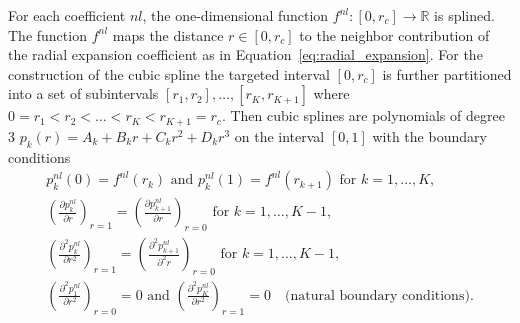 For each coefficient $nl$, the one-dimensional function $f^{nl}:[0,r_c]\rightarrow\mathbb{R}$ is splined.
The function $f^{nl}$ maps the distance $r\in[0,r_c]$ to the neighbor contribution of the radial expansion coefficient as in Equation~\eqref{eq:radial_expansion}.
For the construction of the cubic spline the targeted interval $[0,r_c]$ is further partitioned into a set of subintervals $[r_1, r_2], \ldots, [r_{K}, r_{K+1}]$ where $0 = r_1 < r_2 < \ldots < r_{K} < r_{K+1} = r_c$.
Then cubic splines are polynomials of degree 3 $p_k(r) = A_k + B_kr + C_kr^2 + D_kr^3$ on the interval $[0,1]$ with the boundary conditions
\begin{subequations}
\label{eq:abscissas_boundary_conditions}
\begin{gather}
    p^{nl}_{k}(0) = f^{nl}(r_k)\text{ and } p^{nl}_{k}(1) =  f^{nl}(r_{k+1})\text{ for } k=1,\ldots,K , \label{eq:function_boundary_conditions}\\
    \left(\frac{\partial p^{nl}_{k}}{\partial r}\right)_{r=1} = \left(\frac{\partial p^{nl}_{k+1}}{\partial r}\right)_{r=0} \text{ for } k=1,\ldots,K-1  ,\label{eq:derivative_boundary_conditions}\\
    \left(\frac{\partial^2 p^{nl}_{k}}{\partial r^2}\right)_{r=1} = \left(\frac{\partial^2 p^{nl}_{k+1}}{\partial^2 r}\right)_{r=0} \text{ for } k=1,\ldots,K-1  ,\label{eq:second_derivative_boundary_conditions}\\
    \left(\frac{\partial^2 p^{nl}_{1}}{\partial r^2}\right)_{r=0} = 0\text{ and } \left(\frac{\partial^2 p^{nl}_{K}}{\partial r^2}\right)_{r=1}=0\quad\text{(natural boundary conditions)}.\label{eq:natural_boundary_conditions}
\end{gather}
\end{subequations}
